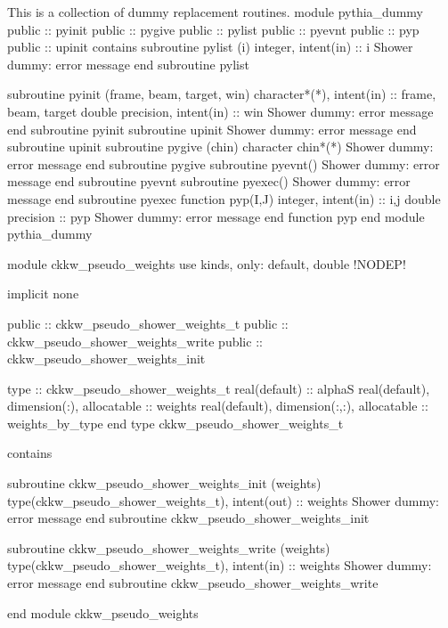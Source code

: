 \eatline
\nwendcode{}\nwdocspar
\nwenddocs{}\nwdocspar
This is a collection of dummy replacement routines.
\nwenddocs{}\endmoddef
module pythia_dummy
  public :: pyinit
  public :: pygive
  public :: pylist
  public :: pyevnt
  public :: pyp
  public :: upinit
contains
  subroutine pylist (i)
    integer, intent(in) :: i
    \LA{}Shower dummy: error message\RA{}
  end subroutine pylist

  subroutine pyinit (frame, beam, target, win)
    character*(*), intent(in) ::  frame, beam, target
    double precision, intent(in) :: win
    \LA{}Shower dummy: error message\RA{}
  end subroutine pyinit
  subroutine upinit
    \LA{}Shower dummy: error message\RA{}
  end subroutine upinit
  subroutine pygive (chin)
    character chin*(*)
    \LA{}Shower dummy: error message\RA{}
  end subroutine pygive
  subroutine pyevnt()
    \LA{}Shower dummy: error message\RA{}
  end subroutine pyevnt
  subroutine pyexec()
    \LA{}Shower dummy: error message\RA{}
  end subroutine pyexec
  function pyp(I,J)
    integer, intent(in) :: i,j
    double precision :: pyp
    \LA{}Shower dummy: error message\RA{}
  end function pyp
end module pythia_dummy


module ckkw_pseudo_weights
  use kinds, only: default, double !NODEP!

  implicit none

  public :: ckkw_pseudo_shower_weights_t
  public :: ckkw_pseudo_shower_weights_write
  public :: ckkw_pseudo_shower_weights_init

  type :: ckkw_pseudo_shower_weights_t
     real(default) :: alphaS
     real(default), dimension(:), allocatable :: weights
     real(default), dimension(:,:), allocatable :: weights_by_type
  end type ckkw_pseudo_shower_weights_t

contains

  subroutine ckkw_pseudo_shower_weights_init (weights)
    type(ckkw_pseudo_shower_weights_t), intent(out) :: weights
    \LA{}Shower dummy: error message\RA{}
  end subroutine ckkw_pseudo_shower_weights_init

  subroutine ckkw_pseudo_shower_weights_write (weights)
    type(ckkw_pseudo_shower_weights_t), intent(in) :: weights
    \LA{}Shower dummy: error message\RA{}
  end subroutine ckkw_pseudo_shower_weights_write

end module ckkw_pseudo_weights


